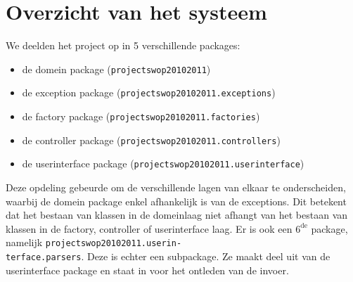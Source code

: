 \section{Overzicht van het systeem}
\label{overzicht}
We deelden het project op in 5 verschillende packages:
\begin{itemize}
 \item de domein package (\verb+projectswop20102011+)
 \item de exception package (\verb+projectswop20102011.exceptions+)
 \item de factory package (\verb+projectswop20102011.factories+)
 \item de controller package (\verb+projectswop20102011.controllers+)
 \item de userinterface package (\verb+projectswop20102011.userinterface+)
\end{itemize}
Deze opdeling gebeurde om de verschillende lagen van elkaar te onderscheiden, waarbij de domein package enkel afhankelijk is van de exceptions.
Dit betekent dat het bestaan van klassen in de domeinlaag niet afhangt van het bestaan van klassen in de factory, controller of userinterface laag.
Er is ook een $\mbox{6}^{\mbox{de}}$ package,
namelijk \verb+projectswop20102011.userin-+\\\verb+terface.parsers+. Deze is echter een subpackage. Ze maakt deel uit van de userinterface package en staat in voor het ontleden van de invoer.
